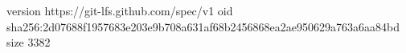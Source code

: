 version https://git-lfs.github.com/spec/v1
oid sha256:2d07688f1957683e203e9b708a631af68b2456868ea2ae950629a763a6aa84bd
size 3382

